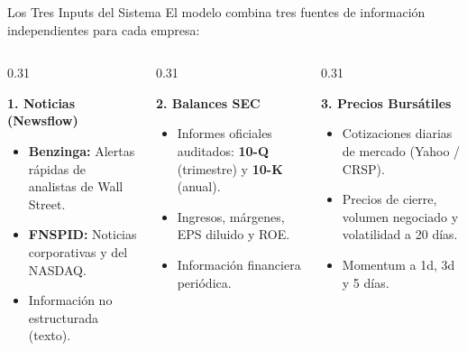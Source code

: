 \documentclass[aspectratio=169,11pt]{beamer}
\begin{document}
\begin{frame}{Los Tres Inputs del Sistema}
    El modelo combina tres fuentes de información independientes para cada empresa:
    \vspace{0.3cm}
    
    \begin{columns}[T]
        \begin{column}{0.31\textwidth}
            \begin{block}{\textbf{1. Noticias (Newsflow)}}
                \begin{itemize}
                    \item \textbf{Benzinga:} Alertas rápidas de analistas de Wall Street.
                    \item \textbf{FNSPID:} Noticias corporativas y del NASDAQ.
                    \item Información no estructurada (texto).
                \end{itemize}
            \end{block}
        \end{column}
        
        \begin{column}{0.31\textwidth}
            \begin{block}{\textbf{2. Balances SEC}}
                \begin{itemize}
                    \item Informes oficiales auditados: \textbf{10-Q} (trimestre) y \textbf{10-K} (anual).
                    \item Ingresos, márgenes, EPS diluido y ROE.
                    \item Información financiera periódica.
                \end{itemize}
            \end{block}
        \end{column}
        
        \begin{column}{0.31\textwidth}
            \begin{block}{\textbf{3. Precios Bursátiles}}
                \begin{itemize}
                    \item Cotizaciones diarias de mercado (Yahoo / CRSP).
                    \item Precios de cierre, volumen negociado y volatilidad a 20 días.
                    \item Momentum a 1d, 3d y 5 días.
                \end{itemize}
            \end{block}
        \end{column}
    \end{columns}
\end{frame}
\end{document}
